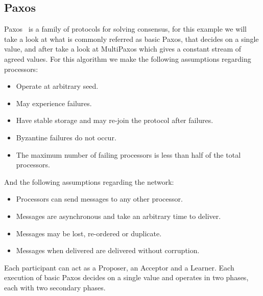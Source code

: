 \subsection{Paxos}\label{sub:paxos}

Paxos~\cite{paxos} is a family of protocols for solving consensus, for this example we will take
a look at what is commonly referred as basic Paxos, that decides on a single value, 
and after take a look at MultiPaxos which gives a constant stream of agreed values. 
For this algorithm we make the following assumptions regarding processors:
\begin{itemize}
  \item Operate at arbitrary seed.
  \item May experience failures.
  \item Have stable storage and may re-join the protocol after failures.
  \item Byzantine failures do not occur.
  \item The maximum number of failing processors is less than half of the total processors.
\end{itemize}
And the following assumptions regarding the network:
\begin{itemize}
  \item Processors can send messages to any other processor.
  \item Messages are asynchronous and take an arbitrary time to deliver.
  \item Messages may be lost, re-ordered or duplicate.
  \item Messages when delivered are delivered without corruption.
\end{itemize}

Each participant can act as a Proposer, an Acceptor and a Learner. Each execution 
of basic Paxos decides on a single value and operates in two phases, each with two
secondary phases.


